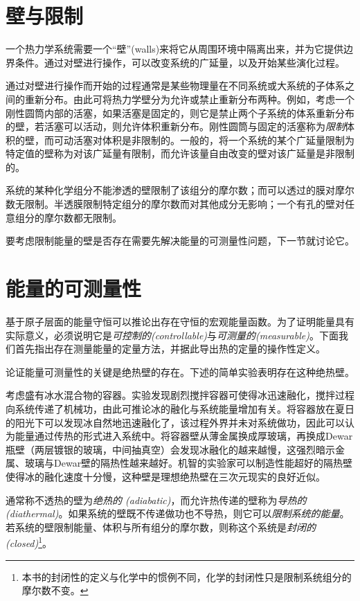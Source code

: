 \section{壁与限制}
\label{sec1.6}
一个热力学系统需要一个“壁”(walls)来将它从周围环境中隔离出来，并为它提供边界条件。通过对壁进行操作，可以改变系统的广延量，以及开始某些演化过程。

通过对壁进行操作而开始的过程通常是某些物理量在不同系统或大系统的子体系之间的重新分布。由此可将热力学壁分为允许或禁止重新分布两种。例如，考虑一个刚性圆筒内部的活塞，如果活塞是固定的，则它是禁止两个子系统的体系重新分布的壁，若活塞可以活动，则允许体积重新分布。刚性圆筒与固定的活塞称为{\it 限制}体积的壁，而可动活塞对体积是非限制的。一般的，将一个系统的某个广延量限制为特定值的壁称为对该广延量有限制，而允许该量自由改变的壁对该广延量是非限制的。

系统的某种化学组分不能渗透的壁限制了该组分的摩尔数；而可以透过的膜对摩尔数无限制。半透膜限制特定组分的摩尔数而对其他成分无影响；一个有孔的壁对任意组分的摩尔数都无限制。

要考虑限制能量的壁是否存在需要先解决能量的可测量性问题，下一节就讨论它。

\section{能量的可测量性}
\label{sec1.7}
基于原子层面的能量守恒可以推论出存在守恒的宏观能量函数。为了证明能量具有实际意义，必须说明它是{\it 可控制的(controllable)}与{\it 可测量的(measurable)}。下面我们首先指出存在测量能量的定量方法，并据此导出热的定量的操作性定义。

论证能量可测量性的关键是绝热壁的存在。下述的简单实验表明存在这种绝热壁。

考虑盛有冰水混合物的容器。实验发现剧烈搅拌容器可使得冰迅速融化，搅拌过程向系统传递了机械功，由此可推论冰的融化与系统能量增加有关。将容器放在夏日的阳光下可以发现冰自然地迅速融化了，该过程外界并未对系统做功，因此可以认为能量通过传热的形式进入系统中。将容器壁从薄金属换成厚玻璃，再换成Dewar瓶壁（两层镀银的玻璃，中间抽真空）会发现冰融化的越来越慢，这强烈暗示金属、玻璃与Dewar壁的隔热性越来越好。机智的实验家可以制造性能超好的隔热壁使得冰的融化速度十分慢，这种壁是理想绝热壁在三次元现实的良好近似。

通常称不透热的壁为{\it 绝热的 (adiabatic)}，而允许热传递的壁称为{\it 导热的 (diathermal)}。如果系统的壁既不传递做功也不导热，则它可以{\it 限制系统的能量}。若系统的壁限制能量、体积与所有组分的摩尔数，则称这个系统是{\it 封闭的 (closed)}\footnote{本书的封闭性的定义与化学中的惯例不同，化学的封闭性只是限制系统组分的摩尔数不变。}。

